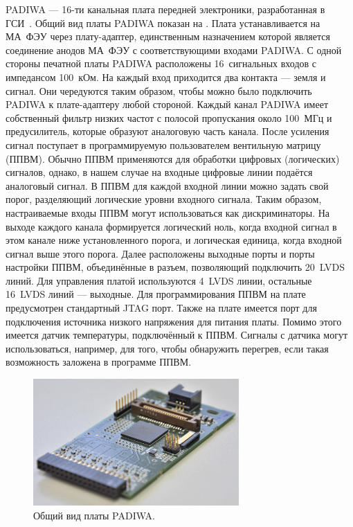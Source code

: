 PADIWA --- 16-ти канальная плата передней электроники, разработанная в ГСИ~\cite{TRBSITE}. Общий вид платы PADIWA показан на . Плата устанавливается на МА~ФЭУ через плату-адаптер, единственным назначением которой является соединение анодов МА~ФЭУ с соответствующими входами PADIWA. С одной стороны печатной платы PADIWA расположены 16~сигнальных входов с импедансом 100~кОм. На каждый вход приходится два контакта --- земля и сигнал. Они чередуются таким образом, чтобы можно было подключить PADIWA к плате-адаптеру любой стороной. Каждый канал PADIWA имеет собственный фильтр низких частот с полосой пропускания около 100~МГц и предусилитель, которые образуют аналоговую часть канала. После усиления сигнал поступает в программируемую пользователем вентильную матрицу (ППВМ). Обычно ППВМ применяются для обработки цифровых (логических) сигналов, однако, в нашем случае на входные цифровые линии подаётся аналоговый сигнал. В ППВМ для каждой входной линии можно задать свой порог, разделяющий логические уровни входного сигнала. Таким образом, настраиваемые входы ППВМ могут использоваться как дискриминаторы. На выходе каждого канала формируется логический ноль, когда входной сигнал в этом канале ниже установленного порога, и логическая единица, когда входной сигнал выше этого порога. Далее расположены выходные порты и порты настройки ППВМ, объединённые в разъем, позволяющий подключить 20~LVDS линий. Для управления платой используются 4~LVDS линии, остальные 16~LVDS линий --- выходные. Для программирования ППВМ на плате предусмотрен стандартный JTAG порт. Также на плате имеется порт для подключения источника низкого напряжения для питания платы. Помимо этого имеется датчик температуры, подключённый к ППВМ. Сигналы с датчика могут использоваться, например, для того, чтобы обнаружить перегрев, если такая возможность заложена в программе ППВМ.

\begin{figure}[H]
\centering
\includegraphics[width=0.7\textwidth]{pictures/5_padiwa_lowres.jpg}
\caption{Общий вид платы PADIWA.}
\label{fig:PADIWA}
\end{figure}

